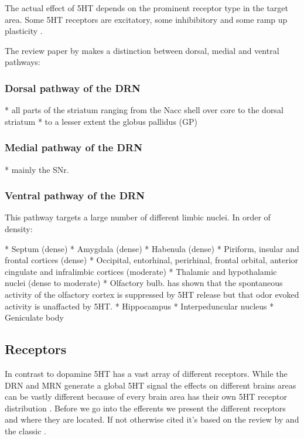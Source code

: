 \documentclass[12pt,a4paper]{article}
\begin{document}
The actual effect of 5HT depends on the prominent receptor type in the target area. Some 5HT receptors are excitatory, some inhibibitory and some ramp up plasticity \citep{Frazer1999}.

The review paper by \citep{Michelsen2007} makes a distinction between dorsal, medial and ventral pathways:

\subsubsection{Dorsal pathway of the DRN}

  * all parts of the striatum ranging from the Nacc shell over core to the dorsal striatum
  * to a lesser extent the globus pallidus (GP)

\subsubsection{Medial pathway of the DRN}

  * mainly the SNr.

\subsubsection{Ventral pathway of the DRN}

This pathway targets a large number of different limbic nuclei. In order of density:

  * Septum (dense)
  * Amygdala (dense)
  * Habenula (dense)
  * Piriform, insular and frontal cortices (dense)
  * Occipital, entorhinal, perirhinal, frontal orbital, anterior cingulate and infralimbic cortices (moderate)
  * Thalamic and hypothalamic nuclei (dense to moderate)
  * Olfactory bulb. \citep{Lottem2016} has shown that the spontaneous activity of the olfactory cortex is suppressed by 5HT release but that odor evoked activity is unaffacted by 5HT.
  * Hippocampus
  * Interpeduncular nucleus
  * Geniculate body


\subsection{Receptors}

In contrast to dopamine 5HT has a vast array of different receptors. While the DRN and MRN generate a global 5HT signal the effects on different brains areas can be vastly different because of every brain area has their own 5HT receptor distribution \citep{Palacios1990} \citep{Carhart-Harris2017}. Before we go into the efferents we present the different receptors and where they are located. If not otherwise cited it's based on the review by \citep{Mengod2010} and the classic \citep{Palacios1990}.
\end{document}
